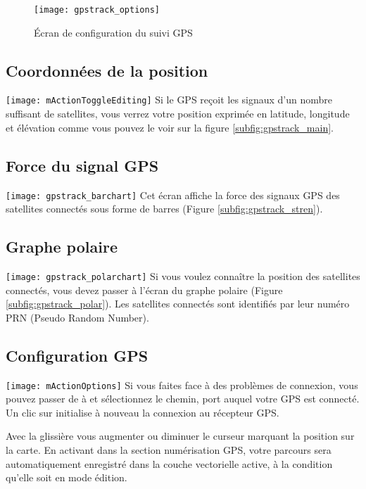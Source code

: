 \begin{figure}[ht]
   \centering
   \texttt{[image: gpstrack\_options]}
   \caption{Écran de configuration du suivi GPS \nixcaption}
   \label{fig:gpstrack_options}
\end{figure}

\subsection{Coordonnées de la position}
\texttt{[image: mActionToggleEditing]} Si le GPS reçoit les signaux d'un nombre suffisant de satellites, vous verrez votre position exprimée en latitude, longitude et élévation comme vous pouvez le voir sur la figure \ref{subfig:gpstrack_main}.

\subsection{Force du signal GPS}
\texttt{[image: gpstrack\_barchart]} Cet écran affiche la force des signaux GPS des satellites connectés sous forme de barres (Figure \ref{subfig:gpstrack_stren}).

\subsection{Graphe polaire}
\texttt{[image: gpstrack\_polarchart]} Si vous voulez connaître la position des satellites connectés, vous devez passer à l'écran du graphe polaire (Figure \ref{subfig:gpstrack_polar}).
Les satellites connectés sont identifiés par leur numéro PRN (Pseudo Random Number).

\subsection{Configuration GPS}
\texttt{[image: mActionOptions]} Si vous faites face à des problèmes de connexion, vous pouvez passer de  à  et sélectionnez le chemin, port auquel votre GPS est connecté. 
Un clic sur  initialise à nouveau la connexion au récepteur GPS.

Avec la glissière  vous augmenter ou diminuer 
le curseur marquant la position sur la carte. En activant  dans la section numérisation GPS, votre parcours sera 
automatiquement enregistré dans la couche vectorielle active, à la condition qu'elle soit en mode édition. 


